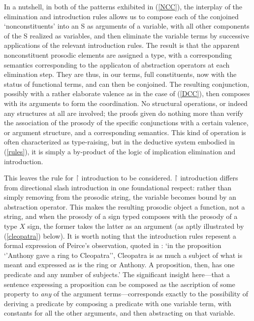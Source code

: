 \documentclass[output=paper,colorlinks,citecolor=brown]{langscibook}
\begin{document}
In a nutshell, in both of the patterns exhibited in (\ref{NCC}), the
interplay of the elimination and introduction rules allows us to
compose each of the conjoined `nonconstituents' into an S as arguments
of a variable, with all other components of the S realized as
variables, and then eliminate the variable terms by successive
applications of the relevant introduction rules. The result is that
the apparent nonconstituent prosodic elements are assigned a type,
with a corresponding semantics corresponding to the applicaton of
abstraction operators at each elimination step. They are thus, in our
terms, full constituents, now with the status of functional terms, and
can then be conjoined. The resulting conjunction, possibly with a
rather elaborate valence as in the case of (\ref{DCC}), then composes with
its arguments to form the coordination. No structural operations, or
indeed any structures at all are involved; the proofs given do
nothing more than verify the association of the prosody of the
specific conjunctions with a certain valence, or argument structure,
and a corresponding semantics. This kind of operation is often
characterized as type-raising, but in the deductive system embodied in
(\ref{rules}), it is simply a by-product of the logic of implication
elimination and introduction.

This leaves the rule for \ensuremath{\vs} introduction to be considered. \ensuremath{\vs}
introduction differs from directional slash introduction in one
foundational respect: rather than simply removing \pt{ \ensuremath{\greekp} } from the
prosodic string, the variable becomes bound by an abstraction
operator. This makes the resulting prosodic object a function, not a
string, and when the prosody of a sign typed  composes with
the prosody of a type $X$ sign, the former takes the latter as an
argument (as aptly illustrated by (\ref{cleopatra}) below).  It is worth
noting that the introduction rules repesent a formal expression of
Peirce's observation, quoted in \citet[8]{nothPeirce}: `in the proposition
{`'}Anthony gave a ring to Cleopatra'', Cleopatra is as much a subject of what is
meant and expressed as is the ring or Anthony. A proposition, then,
has one predicate and any number of subjects.' The significant insight
here---that a sentence expressing a proposition can be composed as the
ascription of some property to \textsl{any} of the argument
terms---corresponds exactly to the possibility of deriving a predicate
by composing a predicate with one variable term, with constants for
all the other arguments, and then abstracting on that
variable.
\end{document}
